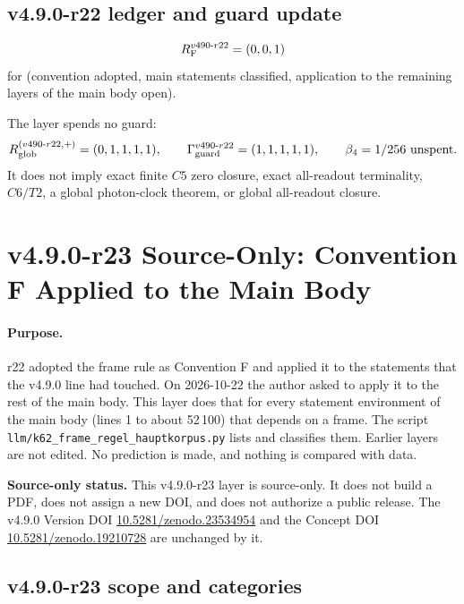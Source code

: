 \subsection*{v4.9.0-r22 ledger and guard update}
\label{subsec:v490-r22-ledger-guard}

\[
R_{\rm F}^{v490\text{-}r22}=(0,0,1)
\]
for (convention adopted, main statements classified, application to the remaining layers of the main body open).

The layer spends no guard:
\[
R_{\rm glob}^{(v490\text{-}r22,+)}=(0,1,1,1,1),
\qquad
\Gamma_{\rm guard}^{v490\text{-}r22}=(1,1,1,1,1),
\qquad
\beta_4=1/256\ \text{unspent}.
\]
It does not imply exact finite \(C5\) zero closure, exact all-readout terminality,
\(C6/T2\), a global photon-clock theorem, or global all-readout closure.

\clearpage
\section*{v4.9.0-r23 Source-Only: Convention F Applied to the Main Body}
\label{sec:v490-r23-convention-f-main-body}

\paragraph{Purpose.}
r22 adopted the frame rule as Convention F and applied it to the statements that the v4.9.0 line had touched.  On 2026-10-22
the author asked to apply it to the rest of the main body.  This layer does that for every statement environment of the main
body (lines 1 to about 52\,100) that depends on a frame.  The script \texttt{llm/k62\_frame\_regel\_hauptkorpus.py} lists and
classifies them.  Earlier layers are not edited.  No prediction is made, and nothing is compared with data.

\noindent\textbf{Source-only status.}
This v4.9.0-r23 layer is source-only.  It does not build a PDF, does not assign a new DOI,
and does not authorize a public release.  The v4.9.0 Version DOI
\href{https://doi.org/10.5281/zenodo.23534954}{10.5281/zenodo.23534954} and the Concept DOI
\href{https://doi.org/10.5281/zenodo.19210728}{10.5281/zenodo.19210728} are unchanged by it.

\subsection*{v4.9.0-r23 scope and categories}
\label{subsec:v490-r23-scope}

